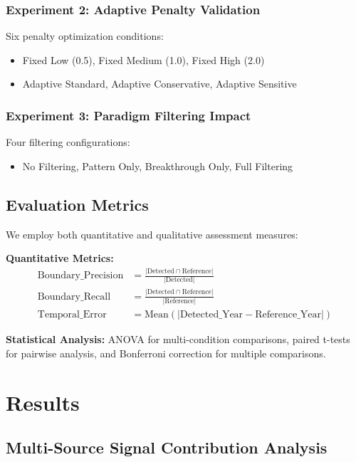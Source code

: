 \documentclass[conference]{IEEEtran}
\begin{document}
\subsubsection{Experiment 2: Adaptive Penalty Validation}
Six penalty optimization conditions:
\begin{itemize}
\item Fixed Low (0.5), Fixed Medium (1.0), Fixed High (2.0)
\item Adaptive Standard, Adaptive Conservative, Adaptive Sensitive
\end{itemize}

\subsubsection{Experiment 3: Paradigm Filtering Impact}
Four filtering configurations:
\begin{itemize}
\item No Filtering, Pattern Only, Breakthrough Only, Full Filtering
\end{itemize}

\subsection{Evaluation Metrics}

We employ both quantitative and qualitative assessment measures:

\textbf{Quantitative Metrics:}
\begin{align}
\text{Boundary\_Precision} &= \frac{|\text{Detected} \cap \text{Reference}|}{|\text{Detected}|} \\
\text{Boundary\_Recall} &= \frac{|\text{Detected} \cap \text{Reference}|}{|\text{Reference}|} \\
\text{Temporal\_Error} &= \text{Mean}(|\text{Detected\_Year} - \text{Reference\_Year}|)
\end{align}

\textbf{Statistical Analysis:}
ANOVA for multi-condition comparisons, paired t-tests for pairwise analysis, and Bonferroni correction for multiple comparisons.

\section{Results}

\subsection{Multi-Source Signal Contribution Analysis}
\end{document}
